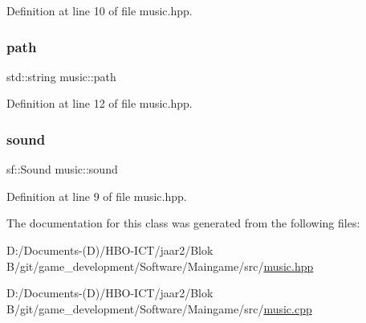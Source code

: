 Definition at line 10 of file music.\+hpp.

\mbox{\label{classmusic_a14adc1380bd15d32bd1a7df66910dabf}} 
\subsubsection{\texorpdfstring{path}{path}}
{\footnotesize\ttfamily std\+::string music\+::path\hspace{0.3cm}{\ttfamily [private]}}



Definition at line 12 of file music.\+hpp.

\mbox{\label{classmusic_a14ba0b22d1e21a9c07b8b24ab50bbb10}} 
\subsubsection{\texorpdfstring{sound}{sound}}
{\footnotesize\ttfamily sf\+::\+Sound music\+::sound\hspace{0.3cm}{\ttfamily [private]}}



Definition at line 9 of file music.\+hpp.



The documentation for this class was generated from the following files\+:\begin{DoxyCompactItemize}
\item 
D\+:/\+Documents-\/(\+D)/\+H\+B\+O-\/\+I\+C\+T/jaar2/\+Blok B/git/game\+\_\+development/\+Software/\+Maingame/src/\hyperlink{music_8hpp}{music.\+hpp}\item 
D\+:/\+Documents-\/(\+D)/\+H\+B\+O-\/\+I\+C\+T/jaar2/\+Blok B/git/game\+\_\+development/\+Software/\+Maingame/src/\hyperlink{music_8cpp}{music.\+cpp}\end{DoxyCompactItemize}
